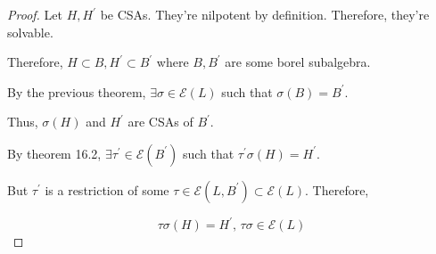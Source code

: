 \documentclass{article}
\theoremstyle{definition}
\begin{document}
    \begin{proof}
        Let \(H,H^{\prime}\) be CSAs. They're nilpotent by definition. Therefore, they're solvable. 

        Therefore, \(H \subset B, H^{\prime} \subset B^{\prime}\) where \(B,B^{\prime}\) are some borel subalgebra.

        By the previous theorem, \(\exists \sigma \in \mathscr{E}(L)\) such that \(\sigma(B) = B^{\prime}\).

        Thus, \(\sigma(H)\) and \(H^{\prime}\) are CSAs of \(B^{\prime}\).

        By theorem 16.2, \(\exists \tau^{\prime} \in \mathscr{E}(B^{\prime})\) such that \(\tau ^{\prime} \sigma (H) = H^{\prime}\).

        But \(\tau ^{\prime} \) is a restriction of some \(\tau \in \mathscr{E}(L,B^{\prime}) \subset \mathscr{E}(L)\). Therefore,

        \[
            \tau \sigma (H) = H^{\prime}, \, \tau \sigma \in \mathscr{E}(L)
        \]

    \end{proof}
\end{document}

